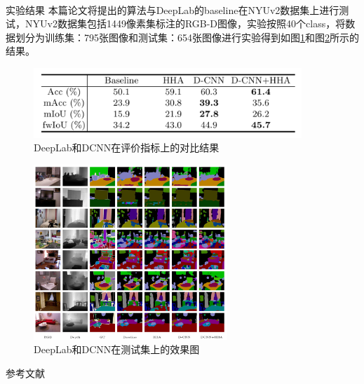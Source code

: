 \documentclass{beamer}
\newcommand{\upcite}[1]{\textsuperscript{\textsuperscript{\cite{#1}}}}
\begin{document}
\begin{frame}[allowframebreaks]{实验结果}
本篇论文将提出的算法与DeepLab的baseline在NYUv2\upcite{silberman2012indoor}数据集上进行测试，NYUv2数据集包括1449像素集标注的RGB-D图像，实验按照40个class，将数据划分为训练集：795张图像和测试集：654张图像进行实验得到如图\ref{res1}和图\ref{res2}所示的结果。

\begin{figure}[h]
	\centering
	\includegraphics[width=0.9\textwidth]{images/res1.png}
	\caption{\label{res1}DeepLab和DCNN在评价指标上的对比结果}
\end{figure}

\begin{figure}[h]
	\centering
	\includegraphics[width=0.65\textwidth]{images/res2.png}
	\caption{\label{res2}DeepLab和DCNN在测试集上的效果图}
\end{figure}
\end{frame}

\begin{frame}[allowframebreaks]{参考文献}
\printbibliography
\end{frame}

\end{document}
